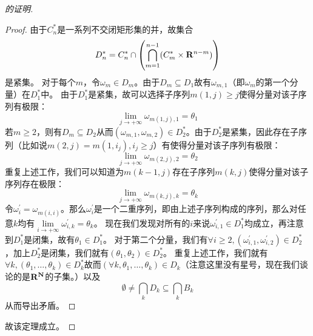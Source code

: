 \documentclass[main.tex]{subfiles}
\begin{document}
\begin{proof}[的证明]
\begin{proof}
	由于\(C_n^*\)是一系列不交闭矩形集的并，故集合
	\[D_n^* = C_n^*\cap\del{\bigcap_{m=1}^{n-1}(C_m^*\times\R^{n-m})}\]
	是紧集。
	对于每个\(m\)，令\(\omega_m \in D_m\)。由于\(D_m \subseteq D_1\)故有\(\omega_{m,1}\)（即\(\omega_m\)的第一个分量）在\(D_1^*\)中。
	由于\(D_1^*\)是紧集，故可以选择子序列\(m(1,j)\geq j\)使得分量对该子序列有极限：
	\[\lim\limits_{j\rightarrow+\infty}\omega_{m(1,j),1} = \theta_1\]
	若\(m\geq 2\)，则有\(D_m \subseteq D_2\)从而\((\omega_{m,1}, \omega_{m,2}) \in D_2^*\)。由于\(D_2^*\)是紧集，因此存在子序列（比如说\(m(2,j) = m(1, i_j), i_j \geq j\)）有使得分量对该子序列有极限：
	\[\lim\limits_{j\rightarrow +\infty}\omega_{m(2, j),2} = \theta_2\]
	重复上述工作，我们可以知道为\(m(k-1, j)\)存在子序列\(m(k,j)\)使得分量对该子序列存在极限：
	\[\lim\limits_{j\rightarrow +\infty}\omega_{m(k, j),k} = \theta_k\]
	令\(\omega^\prime_i = \omega_{m(i,i)}\)。那么\(\omega^\prime_i\)是一个二重序列，即由上述子序列构成的序列，那么对任意\(k\)均有\(\lim\limits_{i\rightarrow +\infty} \omega^\prime_{i,k} = \theta_k\)。
	现在我们发现对所有的\(i\)来说\(\omega^\prime_{i,1} \in D_1^*\)均成立，再注意到\(D_1^*\)是闭集，故有\(\theta_1 \in D_1^*\)。
	对于第二个分量，我们有\(\forall i\geq 2, (\omega^\prime_{i,1}, \omega^\prime_{i,2}) \in D_2^*\)，加上\(D_2^*\)是闭集，我们就有\((\theta_1, \theta_2) \in D_2^*\)。
	重复上述工作，我们就有\(\forall k, (\theta_1, \dots, \theta_k) \in D_k^*\)故而\((\forall k, \theta_1, \dots, \theta_k)\in D_k\)（注意这里没有星号，现在我们谈论的是\(\mathbf{R}^{\mathbf{N}}\)的子集。）以及
	\[\emptyset \neq \bigcap_k D_k \subseteq \bigcap_k B_k\]
	从而导出矛盾。
\end{proof}
	故该定理成立。
\end{proof}
\end{document}
